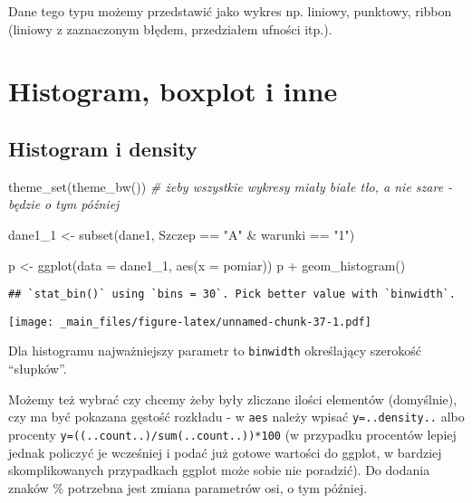\documentclass[
]{book}
\newenvironment{Shaded}{\begin{snugshade}}{\end{snugshade}}
\newcommand{\AttributeTok}[1]{\textcolor[rgb]{0.77,0.63,0.00}{#1}}
\newcommand{\CommentTok}[1]{\textcolor[rgb]{0.56,0.35,0.01}{\textit{#1}}}
\newcommand{\FunctionTok}[1]{\textcolor[rgb]{0.00,0.00,0.00}{#1}}
\newcommand{\NormalTok}[1]{#1}
\newcommand{\OtherTok}[1]{\textcolor[rgb]{0.56,0.35,0.01}{#1}}
\newcommand{\SpecialCharTok}[1]{\textcolor[rgb]{0.00,0.00,0.00}{#1}}
\newcommand{\StringTok}[1]{\textcolor[rgb]{0.31,0.60,0.02}{#1}}
\begin{document}
Dane tego typu możemy przedstawić jako wykres np. liniowy, punktowy, ribbon (liniowy z zaznaczonym błędem, przedziałem ufności itp.).

\hypertarget{histogram-boxplot-i-inne}{%
\section{Histogram, boxplot i inne}\label{histogram-boxplot-i-inne}}

\hypertarget{histogram-i-density}{%
\subsection{Histogram i density}\label{histogram-i-density}}

\begin{Shaded}
\begin{Highlighting}[]
\FunctionTok{theme\_set}\NormalTok{(}\FunctionTok{theme\_bw}\NormalTok{()) }\CommentTok{\# żeby wszystkie wykresy miały białe tło, a nie szare {-} będzie o tym później}

\NormalTok{dane1\_1 }\OtherTok{\textless{}{-}} \FunctionTok{subset}\NormalTok{(dane1, Szczep }\SpecialCharTok{==} \StringTok{"A"} \SpecialCharTok{\&}\NormalTok{ warunki }\SpecialCharTok{==} \StringTok{"1"}\NormalTok{)}

\NormalTok{p }\OtherTok{\textless{}{-}} \FunctionTok{ggplot}\NormalTok{(}\AttributeTok{data =}\NormalTok{ dane1\_1, }\FunctionTok{aes}\NormalTok{(}\AttributeTok{x =}\NormalTok{ pomiar))}
\NormalTok{p }\SpecialCharTok{+} \FunctionTok{geom\_histogram}\NormalTok{()}
\end{Highlighting}
\end{Shaded}

\begin{verbatim}
## `stat_bin()` using `bins = 30`. Pick better value with `binwidth`.
\end{verbatim}

\texttt{[image: \_main\_files/figure-latex/unnamed-chunk-37-1.pdf]}

Dla histogramu najważniejszy parametr to \texttt{binwidth} określający szerokość ``słupków''.

Możemy też wybrać czy chcemy żeby były zliczane ilości elementów (domyślnie), czy ma być pokazana gęstość rozkładu - w \texttt{aes} należy wpisać \texttt{y=..density..} albo procenty \texttt{y=((..count..)/sum(..count..))*100} (w przypadku procentów lepiej jednak policzyć je wcześniej i podać już gotowe wartości do ggplot, w bardziej skomplikowanych przypadkach ggplot może sobie nie poradzić). Do dodania znaków \% potrzebna jest zmiana parametrów osi, o tym później.
\end{document}
